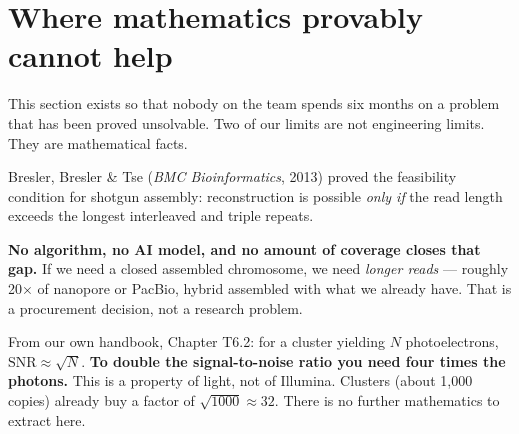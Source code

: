 \clearpage
\renewcommand{\sectioncolor}{alert}
\section{Where mathematics provably cannot help}

This section exists so that nobody on the team spends six months on a problem that has been proved
unsolvable. Two of our limits are not engineering limits. They are mathematical facts.

\begin{alertbox}[title={Limit 1 --- repeats longer than the read cannot be resolved. At all.}]
Bresler, Bresler \& Tse (\textit{BMC Bioinformatics}, 2013) proved the feasibility condition for
shotgun assembly: reconstruction is possible \emph{only if} the read length exceeds the longest
interleaved and triple repeats.
\begin{center}
\end{center}
\vspace{-6pt}
\textbf{No algorithm, no AI model, and no amount of coverage closes that gap.} If we need a closed
assembled chromosome, we need \emph{longer reads} --- roughly 20$\times$ of nanopore or PacBio, hybrid
assembled with what we already have. That is a procurement decision, not a research problem.
\end{alertbox}

\begin{alertbox}[title={Limit 2 --- photon shot noise}]
From our own handbook, Chapter T6.2: for a cluster yielding $N$ photoelectrons,
$\mathrm{SNR}\approx\sqrt{N}$. \textbf{To double the signal-to-noise ratio you need four times the
photons.} This is a property of light, not of Illumina. Clusters (about 1{,}000 copies) already buy
a factor of $\sqrt{1000}\approx32$. There is no further mathematics to extract here.
\end{alertbox}

